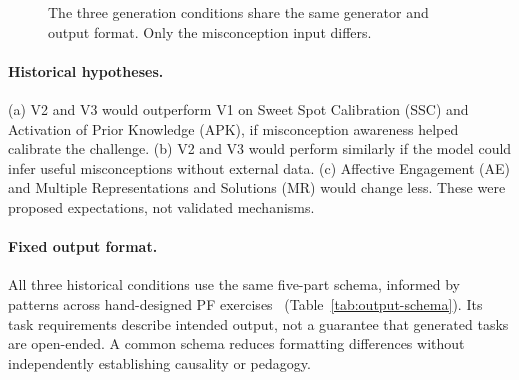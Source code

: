 \begin{figure}[h]
\centering
{}
\caption{The three generation conditions share the same generator and output format. Only the misconception input differs.}
\label{fig:generation-conditions}
\end{figure}

\paragraph{Historical hypotheses.} (a) V2 and V3 would outperform V1 on Sweet Spot Calibration (SSC) and Activation of Prior Knowledge (APK), if misconception awareness helped calibrate the challenge. (b) V2 and V3 would perform similarly if the model could infer useful misconceptions without external data. (c) Affective Engagement (AE) and Multiple Representations and Solutions (MR) would change less. These were proposed expectations, not validated mechanisms.

\paragraph{Fixed output format.} All three historical conditions use the same five-part schema, informed by patterns across hand-designed PF exercises~\cite{kapur2012,loibl2014,rahimi2025} (Table~\ref{tab:output-schema}). Its task requirements describe intended output, not a guarantee that generated tasks are open-ended. A common schema reduces formatting differences without independently establishing causality or pedagogy.


